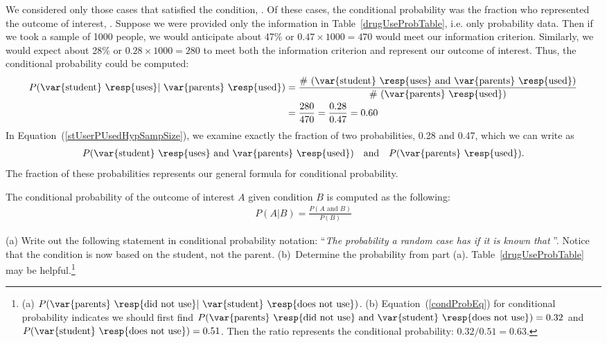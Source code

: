 We considered only those cases that satisfied the condition,  . Of these cases, the conditional probability was the fraction who represented the outcome of interest,  . Suppose we were provided only the information in Table~\vref{drugUseProbTable}, i.e. only probability data. Then if we took a sample of 1000 people, we would anticipate about 47\% or $0.47\times 1000 = 470$ would meet our information criterion. Similarly, we would expect about 28\% or $0.28\times 1000 = 280$ to meet both the information criterion and represent our outcome of interest. Thus, the conditional probability could be computed:
\begin{align}
P(\text{\var{student} \resp{uses}} | \text{ \var{parents} \resp{used}})
	&= \frac{\text{\# (\var{student} \resp{uses} and \var{parents} \resp{used})}}{\text{\# (\var{parents} \resp{used})}} \notag \\
	&= \frac{280}{470} = \frac{0.28}{0.47} = 0.60
\label{stUserPUsedHypSampSize}
\end{align}
In Equation~(\ref{stUserPUsedHypSampSize}), we examine exactly the fraction of two probabilities, 0.28 and 0.47, which we can write as
\begin{align*}
P(\text{\var{student} \resp{uses} and \var{parents} \resp{used}})
	\quad\text{and}\quad
	P(\text{\var{parents} \resp{used}}).
\end{align*}
The fraction of these probabilities represents our general formula for conditional probability.

\begin{termBox}{
The conditional probability of the outcome of interest $A$ given condition $B$ is computed as the following: \vspace{-1.5mm}
\begin{eqnarray}
P(A | B) = \frac{P(A\text{ and }B)}{P(B)}
\label{condProbEq}
\end{eqnarray}}
\end{termBox}

\begin{exercise}\label{drugUseProbOfParentsEqualNotGivenStudents}
(a) Write out the following statement in conditional probability notation: ``\emph{The probability a random case has   if it is known that  }''. Notice that the condition is now based on the {student}, not the {parent}. (b)~Determine the probability from part (a). Table~\vref{drugUseProbTable} may be helpful.\footnote{(a) $P(\text{\var{parents}  \resp{did not use}} | \text{ \var{student} \resp{does not use}})$. (b) Equation~(\ref{condProbEq}) for conditional probability indicates we should first find $P(\text{\var{parents} \resp{did not use} and \var{student} \resp{does not use}})=0.32$ and $P(\text{\var{student} \resp{does not use}})=0.51$. Then the ratio represents the conditional probability: $0.32/0.51 = 0.63$.}
\end{exercise}


